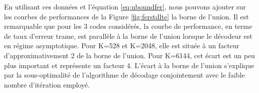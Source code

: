 \begin{table}[]
\centering
\caption{Spectre de distance pour trois turbo codes du standard LTE}
\label{tab:spectre}
\end{table}
En utilisant ces données et l'équation \ref{eq:uboundfer}, nous pouvons ajouter sur les courbes de performances de la Figure 
\ref{fig:ferstdlte} la borne de l'union. Il est remarquable que pour les 3 codes considérés, la courbe de 
performance, en terme de taux d'erreur trame, est parallèle à la borne de l'union lorsque le décodeur est en régime asymptotique. Pour K=528 et K=2048, 
elle est située à un facteur d'approximativement 2 de la borne de l'union. Pour K=6144, cet écart 
est un peu plus important et représente un facteur 4. L'écart à la borne de l'union s'explique par la sous-optimalité de 
l'algorithme de décodage conjointement avec le faible nombre d'itération employé.


